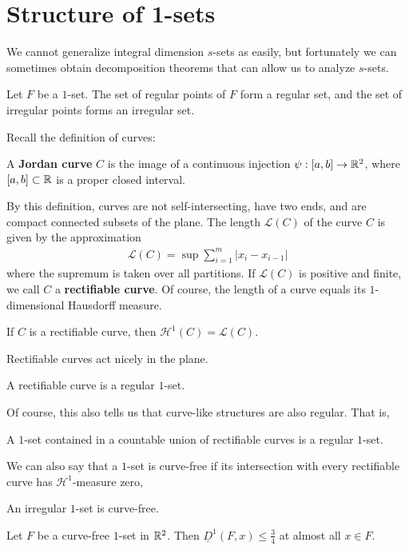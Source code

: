 \documentclass{memoir}
\begin{document}
\section{Structure of 1-sets}
\label{sec:structure_of_1_sets}

We cannot generalize integral dimension \(s\)-sets as easily, but fortunately we can sometimes obtain decomposition theorems that can allow us to analyze \(s\)-sets.

\begin{thm}
	Let \(F\) be a \(1\)-set. The set of regular points of \(F\) form a regular set, and the set of irregular points forms an irregular set.
\end{thm}

Recall the definition of curves:
\begin{defn}
	A \textbf{Jordan curve} \(C\) is the image of a continuous injection \(\psi:[a,b]\to \mathbb{R}^2\), where \([a,b] \subset \mathbb{R}\) is a proper closed interval.
\end{defn}
By this definition, curves are not self-intersecting, have two ends, and are compact connected subsets of the plane. The length \(\mathcal{L}(C)\) of the curve \(C\) is given by the approximation
\begin{align*}
	\mathcal{L}(C) = \sup \sum_{i=1}^{m} \left| x_i - x_{i-1} \right| 
\end{align*}
where the supremum is taken over all partitions. If \(\mathcal{L}(C)\) is positive and finite, we call \(C\) a \textbf{rectifiable curve}. Of course, the length of a curve equals its \(1\)-dimensional Hausdorff measure.

\begin{lemma}
	If \(C\) is a rectifiable curve, then \(\mathcal{H}^{1}(C) = \mathcal{L}(C)\).
\end{lemma}
Rectifiable curves act nicely in the plane.
\begin{lemma}
	A rectifiable curve is a regular \(1\)-set.
\end{lemma}
Of course, this also tells us that curve-like structures are also regular. That is,
\begin{prop}
	A \(1\)-set contained in a countable union of rectifiable curves is a regular \(1\)-set.
\end{prop}
We can also say that a \(1 \)-set is curve-free if its intersection with every rectifiable curve has \(\mathcal{H}^{1}\)-measure zero,
\begin{prop}
	An irregular \(1\)-set is curve-free.
\end{prop}
\begin{prop}
	Let \(F\) be a curve-free \(1\)-set in \(\mathbb{R}^2\). Then \(\underline{D}^{1}(F,x) \leq \frac{3}{4}\) at almost all \(x \in F\).
\end{prop}
\end{document}
